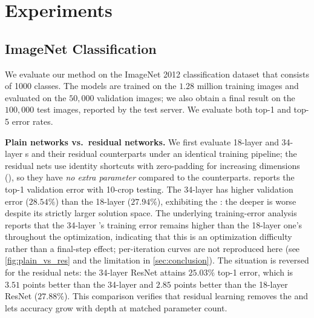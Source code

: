 \section{Experiments}
\label{sec:exp}

\subsection{ImageNet Classification}
\label{sec:imagenet}
We evaluate our method on the ImageNet 2012 classification dataset that consists
of 1000 classes. The models are trained on the $1.28$ million training images
and evaluated on the $50{,}000$ validation images; we also obtain a final result
on the $100{,}000$ test images, reported by the test server. We evaluate both
top-1 and top-5 error rates.

\noindent\textbf{Plain networks vs.\ residual networks.}
We first evaluate 18-layer and 34-layer \plainnet{}s and their residual
counterparts under an identical training pipeline; the residual nets use
identity shortcuts with zero-padding for increasing dimensions (\optA), so they
have \emph{no extra parameter} compared to the \plainnet{} counterparts.
 reports the top-1 validation error with 10-crop testing.
The 34-layer \plainnet{} has higher validation error ($28.54\%$) than the
18-layer \plainnet{} ($27.94\%$), exhibiting the \degrad{}: the deeper
\plainnet{} is worse despite its strictly larger solution space. The underlying
training-error analysis reports that the 34-layer \plainnet{}'s training error
remains higher than the 18-layer one's throughout the optimization, indicating
that this is an optimization difficulty rather than a final-step effect; per-iteration
curves are not reproduced here (see \cref{fig:plain_vs_res} and the limitation in
\cref{sec:conclusion}). The situation is reversed for the residual nets: the
34-layer ResNet attains $25.03\%$ top-1 error, which is $3.51$ points better than
the 34-layer \plainnet{} and $2.85$ points better than the 18-layer ResNet
($27.88\%$). This comparison verifies that residual learning removes the
\degrad{} and lets accuracy grow with depth at matched parameter count.

